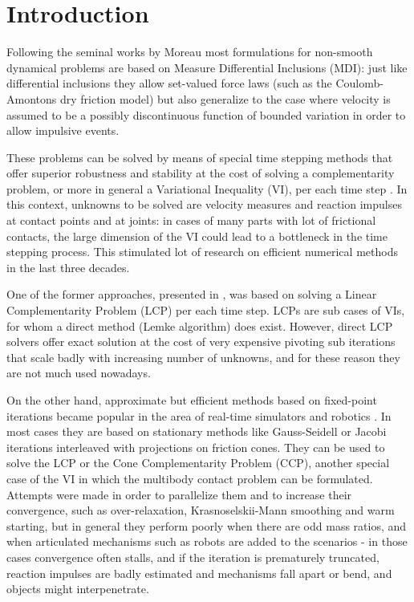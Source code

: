 \documentclass[final,3p]{elsarticle}
\begin{document}


\section{Introduction}

Following the seminal works by Moreau 
\cite{mor88,Jean1992} 
most formulations for non-smooth dynamical problems are based on Measure Differential Inclusions (MDI): just like differential inclusions they allow set-valued force laws (such as the Coulomb-Amontons dry friction model) but also generalize to the case where velocity is assumed to be a possibly discontinuous function of bounded variation in order to allow impulsive events.

These problems can be solved by means of special time stepping methods that offer superior robustness and stability at the cost of solving a complementarity problem, or more in general a Variational Inequality (VI), per each time step
 \cite{acary2008numerical}. 
In this context, unknowns to be solved are velocity measures and reaction impulses at contact points and at joints: in cases of many parts with lot of frictional contacts, the large dimension of the VI could lead to a bottleneck in the time stepping process. This stimulated lot of research on efficient numerical methods in the last three decades.  

One of the former approaches, presented in 
\cite{StTr95}  %
, was based on solving a Linear Complementarity Problem (LCP) per each time step. LCPs are sub cases of VIs, for whom a direct method (Lemke algorithm) does exist. However, direct LCP solvers offer exact solution at the cost of very expensive pivoting sub iterations that scale badly with increasing number of unknowns, and for these reason they are not much used nowadays.

On the other hand, approximate but efficient methods based on fixed-point iterations became popular in the area of real-time simulators and robotics \cite{Bender2014}.
In most cases they are based on stationary methods like Gauss-Seidell or Jacobi iterations interleaved with projections on friction cones. They can be used to solve the LCP or the Cone Complementarity Problem (CCP), another special case of the VI in which the multibody contact problem can be formulated.
Attempts were made in order to parallelize them and to increase their convergence, such as over-relaxation, Krasnoselskii-Mann smoothing and warm starting, 
\cite{massSplittingRichard2012,TasoraAnitescuCMAME10} %
but in general they perform poorly when there are odd mass ratios, and when articulated mechanisms such as robots are added to the scenarios - in those cases convergence often stalls, and if the iteration is prematurely truncated, reaction impulses are badly estimated and mechanisms fall apart or bend, and objects might interpenetrate. 
\end{document}
